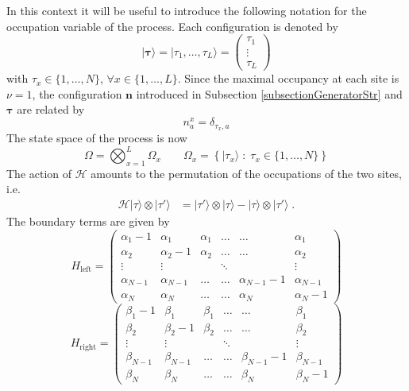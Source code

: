 \documentclass[10pt]{article}
\numberwithin{equation}{section}
\numberwithin{equation}{subsection}
\newcommand{\dt}{\;.}
\begin{document}
 In this context it will be useful to introduce the following notation for the occupation variable of the process. Each configuration is denoted by
\begin{equation}\label{Tau-Notation}
	|\bm{\tau}\rangle=|\tau_{1},\ldots,\tau_{L}\rangle =\begin{pmatrix}
		\tau_{1}\\
		\vdots\\
		\tau_{L}
	\end{pmatrix}
\end{equation} 
with $\tau_{x}\in \{1,\ldots,N\}$, $\forall x\in \{1,\ldots,L\}$. Since the maximal occupancy at each site is $\nu=1$,  the configuration $\bm{n}$ introduced in Subsection \ref{subsectionGeneratorStr} and $\bm{\tau}$ are related by 
\begin{equation}\label{notation-change-relation}
	n_{a}^{x}=\delta_{\tau_{x},a}
\end{equation}
The state space of the process is now 
\begin{equation}
	\Omega=\bigotimes_{x=1}^{L}\Omega_{x}\qquad \Omega_{x}=\left\{|\tau_{x}\rangle\;:\; \tau_{x}\in\{1,\ldots,N\}\right\}
\end{equation}
The action of $\mathcal{H}$ amounts to the permutation of the occupations of the two sites, i.e.
\begin{equation}
	\begin{split}
		\mathcal{H}| \tau\rangle\otimes   |\tau'\rangle&=|\tau'\rangle \otimes |\tau\rangle-|\tau\rangle \otimes|\tau'\rangle\dt
	\end{split}
\end{equation}
The boundary terms are given by 
\begin{equation}
	H_{\text{left}}=\begin{pmatrix}
		\alpha_{1}-1&\alpha_{1}&\alpha_{1}&\ldots&\ldots&\alpha_{1}\\
		\alpha_{2}&\alpha_{2}-1&\alpha_{2}&\ldots&\ldots&\alpha_{2}\\
		\vdots&\vdots& &\ddots& &\vdots\\
		\alpha_{N-1}&\alpha_{N-1}&\ldots&\ldots&\alpha_{N-1}-1&\alpha_{N-1}\\
		\alpha_{N}&\alpha_{N}&\ldots&\ldots&\alpha_{N}&\alpha_{N}-1
	\end{pmatrix}
\end{equation}
\begin{equation}
	H_{\text{right}}=\begin{pmatrix}
		\beta_{1}-1&\beta_{1}&\beta_{1}&\ldots&\ldots&\beta_{1}\\
		\beta_{2}&\beta_{2}-1&\beta_{2}&\ldots&\ldots&\beta_{2}\\
		\vdots&\vdots& &\ddots& &\vdots\\
		\beta_{N-1}&\beta_{N-1}&\ldots&\ldots&\beta_{N-1}-1&\beta_{N-1}\\
		\beta_{N}&\beta_{N}&\ldots&\ldots&\beta_{N}&\beta_{N}-1
	\end{pmatrix}
\end{equation}
\end{document}

